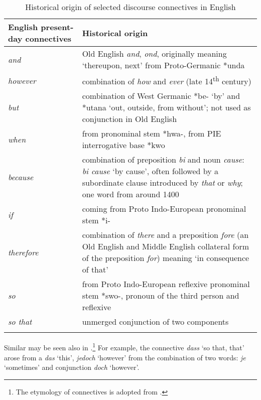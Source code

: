\documentclass[output=paper]{langsci/langscibook.cls}
\begin{document}
\begin{table}[ht]
\begin{tabularx}{\textwidth}{>{\raggedright}lX}
\lsptoprule
{English present-day connectives} &
{Historical origin}\\
\midrule
 \textit{and} &
 Old English \textit{and}, \textit{ond}, originally meaning `thereupon, next' from Proto-Germanic *unda\\
 \tablevspace
 \textit{however} &
 combination of \textit{how} and \textit{ever} (late 14\textsuperscript{th} century)\\
 \tablevspace
 \textit{but} &
 combination of West Germanic *be- `by' and *utana `out, outside, from without'; not used as conjunction in Old English\\
 \tablevspace
 \textit{when} &
 from pronominal stem *hwa-, from PIE interrogative base *kwo\\
 \tablevspace
 \textit{because} &
 combination of preposition \textit{bi} and noun \textit{cause}: \textit{bi cause} `by cause', often followed by a subordinate clause introduced by \textit{that} or \textit{why}; one word from around 1400\\
 \tablevspace
 \textit{if} &
 coming from Proto Indo-European pronominal stem *i- \\
 \tablevspace
 \textit{therefore} &
 combination of \textit{there} and a preposition \textit{fore} (an Old English and Middle English collateral form of the preposition\textit{ for}) meaning `in consequence of that'\\
 \tablevspace
 \textit{so} &
 from Proto Indo-European reflexive pronominal stem *swo-, pronoun of the third person and reflexive\\
 \tablevspace
 \textit{so that} &
 unmerged conjunction of two components\\
\lspbottomrule
\end{tabularx}
\caption{Historical origin of selected discourse connectives in English}
\label{tab:histOriginEN}
\end{table}


Similar  may be seen also in .\footnote{ The etymology of  connectives is adopted from	\citet{klein2010digitale}.} For example, the connective\textit{ dass }`so that, that' arose from a  \textit{das} `this', \textit{jedoch }`however' from the combination of two words: \textit{je} `sometimes' and conjunction \textit{doch} `however'. 
\end{document}
